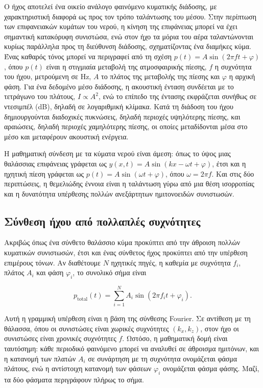 Ο ήχος αποτελεί ένα οικείο ανάλογο φαινόμενο κυματικής διάδοσης, με
χαρακτηριστική διαφορά ως προς τον τρόπο ταλάντωσης του μέσου. Στην
περίπτωση των επιφανειακών κυμάτων του νερού, η κίνηση της επιφάνειας
μπορεί να έχει σημαντική κατακόρυφη συνιστώσα, ενώ στον ήχο τα μόρια του
αέρα ταλαντώνονται κυρίως παράλληλα προς τη διεύθυνση διάδοσης,
σχηματίζοντας ένα διαμήκες κύμα. Ένας καθαρός τόνος μπορεί να περιγραφεί
από τη σχέση \(p(t) = A \sin(2\pi f t + \varphi)\), όπου \(p(t)\) είναι η
στιγμιαία μεταβολή της ατμοσφαιρικής πίεσης, \(f\) η συχνότητα του ήχου,
μετρούμενη σε Hz, \(A\) το πλάτος της μεταβολής της πίεσης και
\(\varphi\) η αρχική φάση. Για ένα δεδομένο μέσο διάδοσης, η ακουστική
ένταση συνδέεται με το τετράγωνο του πλάτους, \(I\propto A^2\), ενώ το
επίπεδο της έντασης εκφράζεται συνήθως σε ντεσιμπέλ (dB), δηλαδή σε
λογαριθμική κλίμακα. Κατά τη διάδοση του ήχου δημιουργούνται διαδοχικές
πυκνώσεις, δηλαδή περιοχές υψηλότερης πίεσης, και αραιώσεις, δηλαδή
περιοχές χαμηλότερης πίεσης, οι οποίες μεταδίδονται μέσα στο μέσο και
μεταφέρουν ακουστική ενέργεια.

Η μαθηματική σύνδεση με τα κύματα νερού είναι άμεση: όπως το ύψος μιας
θαλάσσιας επιφάνειας γράφεται ως
\(y(x,t) = A\sin(kx - \omega t + \varphi)\), έτσι και η ηχητική πίεση
γράφεται ως \(p(t) = A\sin(\omega t + \varphi)\), όπου
\(\omega = 2\pi f\). Και στις δύο περιπτώσεις, η θεμελιώδης έννοια είναι
η ταλάντωση γύρω από μια θέση ισορροπίας και η δυνατότητα υπέρθεσης
πολλών ανεξάρτητων ημιτονοειδών συνιστωσών.



\subsection{Σύνθεση ήχου από πολλαπλές
συχνότητες}\label{ux3c3ux3cdux3bdux3b8ux3b5ux3c3ux3b7-ux3aeux3c7ux3bfux3c5-ux3b1ux3c0ux3cc-ux3c0ux3bfux3bbux3bbux3b1ux3c0ux3bbux3adux3c2-ux3c3ux3c5ux3c7ux3bdux3ccux3c4ux3b7ux3c4ux3b5ux3c2}

Ακριβώς όπως ένα σύνθετο θαλάσσιο κύμα προκύπτει από την άθροιση πολλών
κυματικών συνιστωσών, έτσι και ένας σύνθετος ήχος προκύπτει από την
υπέρθεση επιμέρους τόνων. Αν διαθέτουμε \(N\) ηχητικές πηγές, η καθεμία
με συχνότητα \(f_i\), πλάτος \(A_i\) και φάση \(\varphi_i\), το συνολικό
σήμα είναι

\[
p_{\text{total}}(t) = \sum_{i=1}^{N} A_i \sin(2\pi f_i t + \varphi_i).
\]

Αυτή η γραμμική υπέρθεση είναι η βάση της σύνθεσης Fourier. Σε αντίθεση
με τη θάλασσα, όπου οι συνιστώσες είναι χωρικές συχνότητες
\((k_x, k_z)\), στον ήχο οι συνιστώσες είναι χρονικές συχνότητες \(f\).
Ωστόσο, η μαθηματική δομή είναι ταυτόσημη: κάθε περιοδικό φαινόμενο
μπορεί να αναλυθεί σε άθροισμα ημιτόνων, και η κατανομή των πλατών
\(A_i\) σε συνάρτηση με τη συχνότητα ονομάζεται φάσμα πλάτους, ενώ η
αντίστοιχη κατανομή των φάσεων \(\varphi_i\) ονομάζεται φάσμα φάσης.
Μαζί, τα δύο φάσματα περιγράφουν πλήρως το σήμα.

